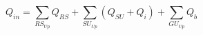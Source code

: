 \begin{equation}
\label{InputDischarge}
Q_{in} = \sum_{RS_{Up}} Q_{RS} + \sum_{SU_{Up}} (Q_{SU} + Q_i) + \sum_{GU_{Up}} Q_b
\end{equation}
